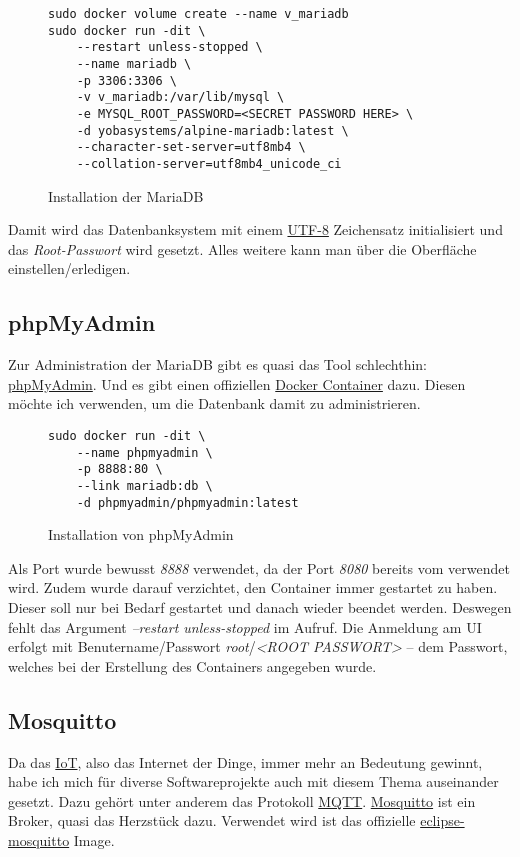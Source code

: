 \documentclass[12pt,a4paper]{article}
\newcommand{\code}[1]{\textit{#1}}
\begin{document}
\begin{figure}[H]
\begin{lstlisting}
sudo docker volume create --name v_mariadb
sudo docker run -dit \
    --restart unless-stopped \
    --name mariadb \
    -p 3306:3306 \
    -v v_mariadb:/var/lib/mysql \
    -e MYSQL_ROOT_PASSWORD=<SECRET PASSWORD HERE> \
    -d yobasystems/alpine-mariadb:latest \
    --character-set-server=utf8mb4 \
    --collation-server=utf8mb4_unicode_ci
\end{lstlisting}
\caption{Installation der MariaDB}\label{fig:Installation der MariaDB}
\end{figure}

Damit wird das Datenbanksystem mit einem \href{https://de.wikipedia.org/wiki/UTF-8}{UTF-8} Zeichensatz initialisiert und
das \code{Root-Passwort} wird gesetzt. Alles weitere kann man über die Oberfläche 
einstellen/erledigen.

\subsection{phpMyAdmin}\label{sub:phpMyAdmin}
Zur Administration der MariaDB gibt es quasi das Tool schlechthin: \href{https://www.phpmyadmin.net/}{phpMyAdmin}. Und
es gibt einen offiziellen \href{https://hub.docker.com/r/phpmyadmin/phpmyadmin}{Docker Container} dazu. Diesen möchte
ich verwenden, um die Datenbank damit zu administrieren.

\begin{figure}[H]
\begin{lstlisting}
sudo docker run -dit \
    --name phpmyadmin \
    -p 8888:80 \
    --link mariadb:db \
    -d phpmyadmin/phpmyadmin:latest
\end{lstlisting}
\caption{Installation von phpMyAdmin}\label{fig:Installation von phpMyAdmin}
\end{figure}

Als Port wurde bewusst \code{8888} verwendet, da der Port \code{8080} bereits vom  verwendet
wird. Zudem wurde darauf verzichtet, den Container immer gestartet zu haben. Dieser soll nur bei Bedarf gestartet und
danach wieder beendet werden. Deswegen fehlt das Argument \code{--restart unless-stopped} im Aufruf. Die Anmeldung am
UI erfolgt mit Benutername/Passwort \code{root}/\code{<ROOT PASSWORT>} -- dem Passwort, welches bei der Erstellung des
\nameref{sub:MariaDB} Containers angegeben wurde.

\subsection{Mosquitto}
Da das \href{https://de.wikipedia.org/wiki/Internet_der_Dinge#targetText=Das%20Internet%20der%20Dinge%20(IdD,und%20Kommunikationstechniken%20zusammenarbeiten%20zu%20lassen.}{IoT},
also das Internet der Dinge, immer mehr an Bedeutung gewinnt, habe ich mich für diverse Softwareprojekte auch mit diesem
Thema auseinander gesetzt. Dazu gehört unter anderem das Protokoll \href{https://mqtt.org/}{MQTT}.
\href{https://mosquitto.org/}{Mosquitto} ist ein Broker, quasi das Herzstück dazu. Verwendet wird ist das offizielle
\href{https://hub.docker.com/_/eclipse-mosquitto}{eclipse-mosquitto} Image.
\end{document}
